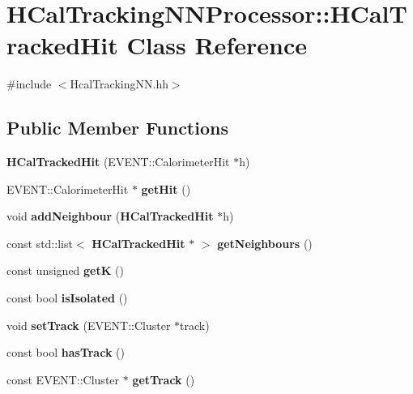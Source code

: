 \section{H\-Cal\-Tracking\-N\-N\-Processor\-:\-:H\-Cal\-Tracked\-Hit Class Reference}
\label{classHCalTrackingNNProcessor_1_1HCalTrackedHit}


{\ttfamily \#include $<$Hcal\-Tracking\-N\-N.\-hh$>$}

\subsection*{Public Member Functions}
\begin{DoxyCompactItemize}
\item 
{\bfseries H\-Cal\-Tracked\-Hit} (E\-V\-E\-N\-T\-::\-Calorimeter\-Hit $\ast$h)\label{classHCalTrackingNNProcessor_1_1HCalTrackedHit_afb2399747fbd27bdb23cd2f7cca9693a}

\item 
E\-V\-E\-N\-T\-::\-Calorimeter\-Hit $\ast$ {\bfseries get\-Hit} ()\label{classHCalTrackingNNProcessor_1_1HCalTrackedHit_ac05da13ef1a516b815bd06597c640cae}

\item 
void {\bfseries add\-Neighbour} ({\bf H\-Cal\-Tracked\-Hit} $\ast$h)\label{classHCalTrackingNNProcessor_1_1HCalTrackedHit_a797b4a358484166656c9eb85d5bee3de}

\item 
const std\-::list$<$ {\bf H\-Cal\-Tracked\-Hit} $\ast$ $>$ {\bfseries get\-Neighbours} ()\label{classHCalTrackingNNProcessor_1_1HCalTrackedHit_a8e78d13b8ecf48433ca0a9d96d4f5bb1}

\item 
const unsigned {\bfseries get\-K} ()\label{classHCalTrackingNNProcessor_1_1HCalTrackedHit_ad873e2e7992a314249ae6ea3bba4b1f4}

\item 
const bool {\bfseries is\-Isolated} ()\label{classHCalTrackingNNProcessor_1_1HCalTrackedHit_a9988328d20aa514fc0d8bac745d9078f}

\item 
void {\bfseries set\-Track} (E\-V\-E\-N\-T\-::\-Cluster $\ast$track)\label{classHCalTrackingNNProcessor_1_1HCalTrackedHit_a4954bee012a96567e9e3d7d3dfc01ddb}

\item 
const bool {\bfseries has\-Track} ()\label{classHCalTrackingNNProcessor_1_1HCalTrackedHit_aa2a18fd5aaa2fb7aefa14b94807efff3}

\item 
const E\-V\-E\-N\-T\-::\-Cluster $\ast$ {\bfseries get\-Track} ()\label{classHCalTrackingNNProcessor_1_1HCalTrackedHit_a9d088a7c2bcf5ad3aeeeed748568c210}

\end{DoxyCompactItemize}
